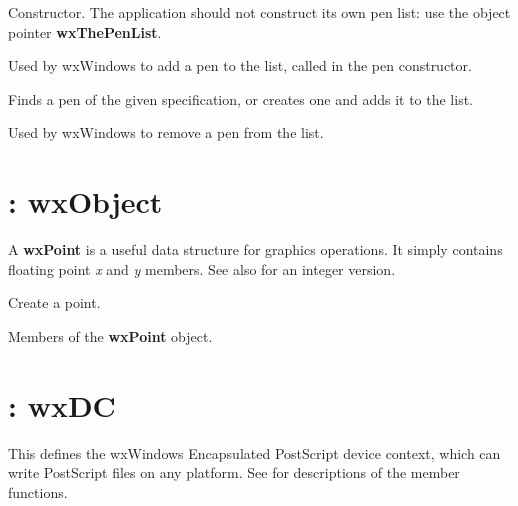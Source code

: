 

Constructor.  The application should not construct its own pen list:
use the object pointer {\bf wxThePenList}.



Used by wxWindows to add a pen to the list, called in the pen constructor.




Finds a pen of the given specification, or creates one and adds it to the list.



Used by wxWindows to remove a pen from the list.

\section{: wxObject}\label{wxpoint}

A {\bf wxPoint} is a useful data structure for graphics operations.
It simply contains floating point {\it x} and {\it y} members.
See also  for an integer version.




Create a point.



Members of the {\bf wxPoint} object.

\section{: wxDC}\label{wxpostscriptdc}

This defines the wxWindows Encapsulated PostScript device context,
which can write PostScript files on any platform. See  for
descriptions of the member functions.

